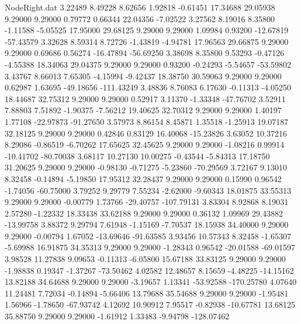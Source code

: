 \begin{filecontents}{NodeRight.dat}
   3.22489    8.49228    8.62656     1.92818   -0.61451   17.34688   29.05938    9.29000    9.29000    0.79772    0.66344   22.04356   -7.02522
   3.27562    8.19016    8.35800    -1.11588   -5.05525   17.95000   29.68125    9.29000    9.29000    1.09984    0.93200  -12.67819  -57.43579
   3.32628    8.59314    8.72726    -1.43819   -4.94781   17.96563   29.66875    9.29000    9.29000    0.69686    0.56274  -16.47894  -56.69250
   3.38698    8.35800    9.53293    -0.47126   -4.55388   18.34063   29.04375    9.29000    9.29000    0.93200   -0.24293   -5.54657  -53.59802
   3.43767    8.66013    7.65305    -4.15994   -9.42437   18.38750   30.59063    9.29000    9.29000    0.62987    1.63695  -49.18656 -111.43249
   3.48836    8.76083    6.17630    -0.11313   -4.05250   18.44687   32.75312    9.29000    9.29000    0.52917    3.11370   -1.33348  -47.76702
   3.52911    7.88803    7.51892    -1.90375   -7.56212   19.40625   32.70312    9.29000    9.29000    1.40197    1.77108  -22.97873  -91.27650
   3.57973    8.86154    8.45871     1.35518   -1.25913   19.07187   32.18125    9.29000    9.29000    0.42846    0.83129   16.40068  -15.23826
   3.63052   10.37216    8.29086    -0.86519   -6.70262   17.65625   32.45625    9.29000    9.29000   -1.08216    0.99914  -10.41702  -80.70038
   3.68117   10.27130   10.00275    -0.43544   -5.84313   17.18750   31.20625    9.29000    9.29000   -0.98130   -0.71275   -5.23860  -70.29569
   3.72167    9.13010    8.32458    -0.14894   -5.19850   17.95312   32.28437    9.29000    9.29000    0.15990    0.96542   -1.74056  -60.75000
   3.79252    9.29779    7.55234    -2.62000   -9.60343   18.01875   33.55313    9.29000    9.29000   -0.00779    1.73766  -29.40757 -107.79131
   3.83304    8.92868    8.19031     2.57280   -1.22332   18.33438   33.62188    9.29000    9.29000    0.36132    1.09969   29.43882  -13.99758
   3.88372    9.29794    7.61948    -1.15169   -7.70537   18.15938   34.40000    9.29000    9.29000   -0.00794    1.67052  -13.69646  -91.63585
   3.93456   10.57343    8.32458    -1.65307   -5.69988   16.91875   34.35313    9.29000    9.29000   -1.28343    0.96542  -20.01588  -69.01597
   3.98528   11.27838    9.09653    -0.11313   -6.05800   15.67188   33.83125    9.29000    9.29000   -1.98838    0.19347   -1.37267  -73.50462
   4.02582   12.48657    8.15659    -4.48225  -14.15162   13.82188   34.64688    9.29000    9.29000   -3.19657    1.13341  -53.92588 -170.25780
   4.07640   11.24481    7.72034    -0.14894   -5.66406   13.79688   35.54688    9.29000    9.29000   -1.95481    1.56966   -1.78650  -67.93742
   4.12692   10.90912    7.95517    -0.82938  -10.67781   13.68125   35.88750    9.29000    9.29000   -1.61912    1.33483   -9.94798 -128.07462

\end{filecontents}
